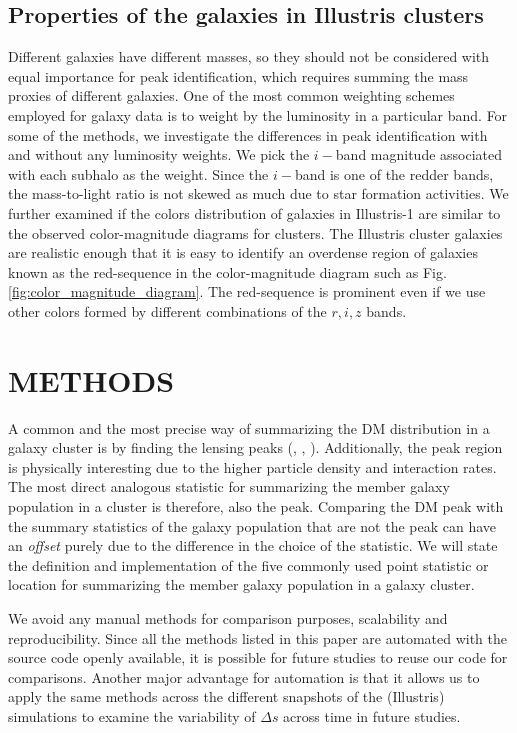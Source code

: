 \subsection{Properties of the galaxies in Illustris clusters}
\label{subsec:galaxy_properties}

Different galaxies have different masses, so they should not be considered with equal
importance for peak identification, which requires summing
the mass proxies of different galaxies. One of the most common weighting schemes employed for galaxy data is to weight
by the luminosity in a particular band. For some of the methods, we investigate
the differences in peak identification with and without any luminosity weights.
We pick the $i-$band magnitude
associated with each subhalo as the weight. Since the $i-$band is
one of the redder bands, the mass-to-light ratio is not skewed as much due to star
formation activities. 
We further examined if the colors distribution of galaxies in Illustris-1 are
similar to the observed color-magnitude diagrams for clusters.
The Illustris cluster galaxies are realistic enough that it is easy to
identify an overdense region of galaxies known as the red-sequence in the 
color-magnitude diagram such as Fig.
\ref{fig:color_magnitude_diagram}. The red-sequence is prominent even if we
use other colors formed by different combinations of the $r, i, z$ bands.

\section{METHODS}\label{sec:methods}
A common and the most precise way of summarizing the DM distribution in a
galaxy cluster is by finding the lensing peaks 
(\citealt{Medezinski2013}, \citealt{Markevitch2004}, \citealt{Zitrin13}).
Additionally, the peak region is physically 
interesting due to the higher particle density and interaction rates. 
The most direct analogous statistic for summarizing the member galaxy
population in a cluster is therefore, also the peak. 
Comparing the DM peak with the summary statistics of the galaxy population that
are not the peak  can have an {\it offset} purely due to the difference in
the choice of the statistic. 
We will state the definition and implementation of the five commonly used 
point statistic or location for summarizing 
the member galaxy population in a galaxy cluster.

We avoid any manual methods for
comparison purposes, scalability and reproducibility. 
Since all the methods listed in this
paper are automated with the source code openly available, 
it is possible for future studies to reuse our code for comparisons. 
Another major advantage for automation is that it allows us  
to apply
the same methods across the different snapshots of the (Illustris) simulations to
examine the variability of $\Delta s$ across time in future studies. 


